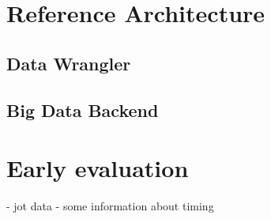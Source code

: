 \section{Reference Architecture}

\subsection{Data Wrangler}

\subsection{Big Data Backend}


\section{Early evaluation}

- jot data
- some information about timing

